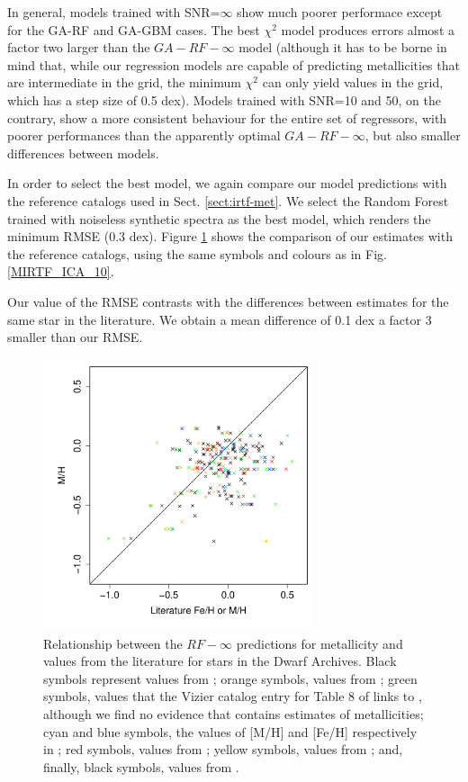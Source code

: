 In general, models trained with SNR=$\infty$ show much poorer
performace except for the GA-RF and GA-GBM cases. The best $\chi^2$
model produces errors almost a factor two larger than the
$GA-RF-\infty$ model (although it has to be borne in mind that, while
our regression models are capable of predicting metallicities that are
intermediate in the grid, the minimum $\chi^2$ can only yield values
in the grid, which has a step size of 0.5 dex). Models trained with
SNR=10 and 50, on the contrary, show a more consistent behaviour for
the entire set of regressors, with poorer performances than the
apparently optimal $GA-RF-\infty$, but also smaller differences
between models.

In order to select the best model, we again compare our model
predictions with the reference catalogs used in
Sect. \ref{sect:irtf-met}. We select the Random Forest trained with
noiseless synthetic spectra as the best model, which renders the
minimum RMSE (0.3 dex). Figure \ref{fig:ipac_mt} shows the comparison
of our estimates with the reference catalogs, using the same symbols
and colours as in Fig. \ref{MIRTF_ICA_10}.

Our value of the RMSE contrasts with the differences between estimates
for the same star in the literature. We obtain a mean difference of
0.1 dex a factor 3 smaller than our RMSE. 

\begin{figure}
 \begin{center} \includegraphics[width=8cm]{figs/ipac-figs/M-RFInf}

\caption{Relationship
 between the $RF-\infty$ predictions for metallicity and values from
 the literature for stars in the Dwarf Archives.  Black symbols
 represent values from \protect\cite{cesetti} ; orange symbols, values
 from \protect\cite{NevesIII}; green symbols, values that the Vizier
 catalog entry for Table 8 of \protect\cite{NevesIII} links
 to \protect\cite{Jao}, although we find no evidence
 that \protect\cite{Jao} contains estimates of metallicities; cyan and
 blue symbols, the values of [M/H] and [Fe/H] respectively
 in \protect\cite{RA2012}; red symbols, values
 from \protect\cite{Mann2015}; yellow symbols, values
 from \protect\cite{Newton2014}; and, finally, black symbols, values
 from \protect\cite{Gaidos2015}.}  \label{fig:ipac_mt} \end{center}
\end{figure}


